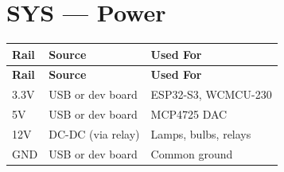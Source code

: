 \documentclass[10pt,a4paper,oneside]{report}
\begin{document}
\section{SYS — Power}

\begin{longtable}{|L{1.2cm}|L{3cm}|L{5cm}|}
\hline
\textbf{Rail} & \textbf{Source} & \textbf{Used For} \\
\hline
\endfirsthead\hline
\textbf{Rail} & \textbf{Source} & \textbf{Used For} \\
\hline
\endhead
3.3V & USB or dev board & ESP32-S3, WCMCU-230 \\
\hline
5V & USB or dev board & MCP4725 DAC \\
\hline
12V & DC-DC (via relay) & Lamps, bulbs, relays \\
\hline
GND & USB or dev board & Common ground \\
\hline
\end{longtable}
\end{document}
